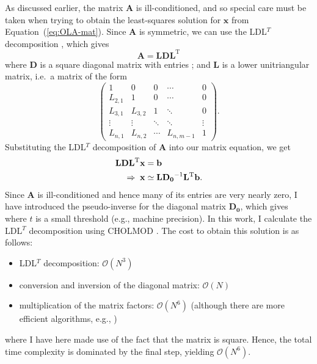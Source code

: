 As discussed earlier, the matrix $\mathbf{A}$ is ill-conditioned, and so special care must be taken when trying to obtain the least-squares solution for $\mathbf{x}$ from Equation~(\ref{eq:OLA-mat}). 
Since $\mathbf{A}$ is symmetric, we can use the LDL$^T$ decomposition \citep[e.g.,][]{banerjee2014linear}, which gives 
\begin{equation}
    \mathbf{A} = \mathbf{LDL}^{\text{T}}
\end{equation}
where $\mathbf{D}$ is a square diagonal matrix with entries ; and $\mathbf{L}$ is a lower unitriangular matrix, i.e.\ a matrix of the form %
\begin{equation} \label{eq:lower-diag}
    \begin{pmatrix}
        1       &   0     & 0      & \cdots & 0 \\[3mm]
        L_{2,1} &   1     & 0      & \cdots & 0 \\[3mm]
        L_{3,1} & L_{3,2} & 1      & \ddots & 0 \\[3mm]
        \vdots  & \vdots  & \ddots & \ddots & \vdots \\[3mm]
        L_{n,1} & L_{n,2} & \cdots & L_{n,m-1} & 1
    \end{pmatrix}.
\end{equation}
Substituting the LDL$^T$ decomposition of $\mathbf A$ into our matrix equation, we get
\begin{align}
    \mathbf{LDL}^{\text{T}} \mathbf{x} &= \mathbf{b} \notag\\
    \Rightarrow\; \mathbf{x} &\simeq \mathbf{LD_0}^{-1}\mathbf{L}^{\text{T}}\mathbf{b}.
\end{align}
Since $\mathbf{A}$ is ill-conditioned and hence many of its entries are very nearly zero, I have introduced the pseudo-inverse for the diagonal matrix $\mathbf{D_0}$, which gives 
where $t$ is a small threshold (e.g., machine precision). 
In this work, I calculate the LDL$^T$ decomposition using {\textsc CHOLMOD} \citep{Chen2008Algorithm8C}. 
The cost to obtain this solution is as follows: 
\begin{itemize}
    \item LDL$^T$ decomposition: ${\mathcal{O}(N^3)}$ \citep{6710599}
    \item conversion and inversion of the diagonal matrix: ${\mathcal{O}(N)}$ %
    \item multiplication of the matrix factors: ${\mathcal{O}(N^6)}$ %
    (although there are more efficient algorithms, e.g., \citealt{COPPERSMITH1990251})
\end{itemize}
where I have here made use of the fact that the matrix is square. 
Hence, the total time complexity is dominated by the final step, yielding $\mathcal{O}(N^6)$. 


